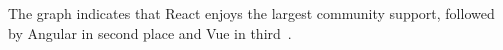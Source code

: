 The graph indicates that React enjoys the largest community support, followed by Angular in second place and Vue in third~\cite{cincovic2020comparison}.








